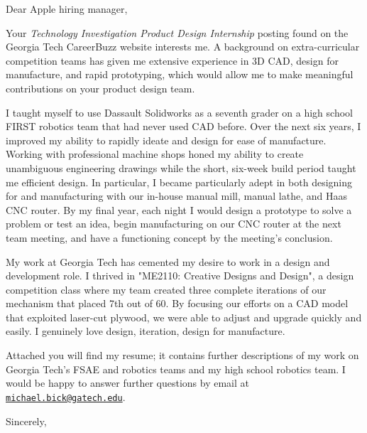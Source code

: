 \documentclass[12pt]{cover_letter}
\begin{document}
  \begin{letter}{}

    \opening{Dear Apple hiring manager,}

    \thispagestyle{fancy}

    Your \textit{Technology Investigation Product Design Internship} posting found on the Georgia Tech CareerBuzz website interests me. A background on extra-curricular competition teams has given me extensive experience in 3D CAD, design for manufacture, and rapid prototyping, which would allow me to make meaningful contributions on your product design team.

    I taught myself to use Dassault Solidworks as a seventh grader on a high school FIRST robotics team that had never used CAD before. Over the next six years, I improved my ability to rapidly ideate and design for ease of manufacture. Working with professional machine shops honed my ability to create unambiguous engineering drawings while the short, six-week build period taught me efficient design. In particular,  I became particularly adept in both designing for and manufacturing with our in-house manual mill, manual lathe, and Haas CNC router. By my final year, each night I would design a prototype to solve a problem or test an idea, begin manufacturing on our CNC router at the next team meeting, and have a functioning concept by the meeting's conclusion.

    My work at Georgia Tech has cemented my desire to work in a design and development role. I thrived in "ME2110: Creative Designs and Design", a design competition class where my team created three complete iterations of our mechanism that placed 7th out of 60. By focusing our efforts on a CAD model that exploited laser-cut plywood, we were able to adjust and upgrade quickly and easily. I genuinely love design, iteration, design for manufacture.

    Attached you will find my resume; it contains further descriptions of my work on Georgia Tech's FSAE and robotics teams and my high school robotics team. I would be happy to answer further questions by email at \href{mailto:michael.bick@gatech.edu}{\nolinkurl{michael.bick@gatech.edu}}.

    \closing{Sincerely,}

  \end{letter}

  
\end{document}
